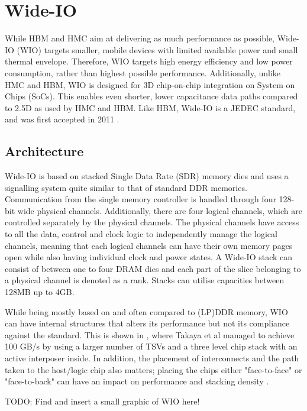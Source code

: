 \section{Wide-IO}
While HBM and HMC aim at delivering as much performance as possible, Wide-IO (WIO) targets smaller, mobile devices with limited available power and small thermal envelope. Therefore, WIO targets high energy efficiency and low power consumption, rather than highest possible performance. Additionally, unlike HMC and HBM, WIO is designed for 3D chip-on-chip integration on System on Chips (SoCs). This enables even shorter, lower capacitance data paths compared to 2.5D as used by HMC and HBM. Like HBM, Wide-IO is a JEDEC standard, and was first accepted in 2011 \cite{standard2011wide}. 

\subsection{Architecture}
Wide-IO is based on stacked Single Data Rate (SDR) memory dies and uses a signalling system quite similar to that of standard DDR memories. Communication from the single memory controller is handled through four 128-bit wide physical channels. Additionally, there are four logical channels, which are controlled separately by the physical channels. The physical channels have access to all the data, control and clock logic to independently manage the logical channels, meaning that each logical channels can have their own memory pages open while also having individual clock and power states. A Wide-IO stack can consist of between one to four DRAM dies and each part of the slice belonging to a physical channel is denoted as a rank. Stacks can utilise capacities between 128MB up to 4GB. 
\bigskip

While being mostly based on and often compared to (LP)DDR memory, WIO can have internal structures that alters its performance but not its compliance against the standard. This is shown in \cite{6487803}, where Takaya et al managed to achieve 100 GB/s by using a larger number of TSVs and a three level chip stack with an active interposer inside. In addition, the placement of interconnects and the path taken to the host/logic chip also matters; placing the chips either "face-to-face" or "face-to-back" can have an impact on performance and stacking density \cite{6248798}.

TODO: Find and insert a small graphic of WIO here!

